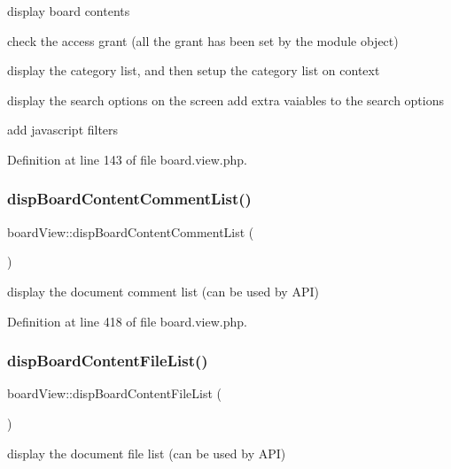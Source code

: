 display board contents 

check the access grant (all the grant has been set by the module object)

display the category list, and then setup the category list on context

display the search options on the screen add extra vaiables to the search options

add javascript filters

Definition at line 143 of file board.\+view.\+php.

\mbox{\label{classboardView_abdb51dc39287afe90501939998733026}} 
\subsubsection{\texorpdfstring{disp\+Board\+Content\+Comment\+List()}{dispBoardContentCommentList()}}
{\footnotesize\ttfamily board\+View\+::disp\+Board\+Content\+Comment\+List (\begin{DoxyParamCaption}{ }\end{DoxyParamCaption})}



display the document comment list (can be used by A\+PI) 



Definition at line 418 of file board.\+view.\+php.

\mbox{\label{classboardView_af652511173e1def272b5672844a92661}} 
\subsubsection{\texorpdfstring{disp\+Board\+Content\+File\+List()}{dispBoardContentFileList()}}
{\footnotesize\ttfamily board\+View\+::disp\+Board\+Content\+File\+List (\begin{DoxyParamCaption}{ }\end{DoxyParamCaption})}



display the document file list (can be used by A\+PI) 

